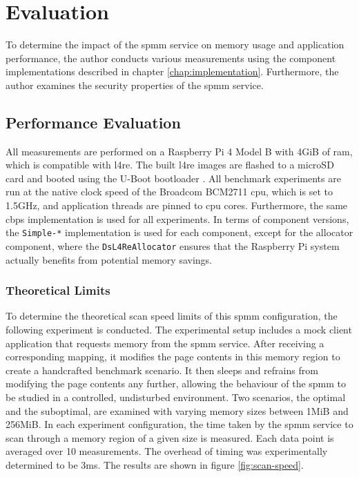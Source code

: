 \chapter{Evaluation}
\label{chap:evaluation}

To determine the impact of the \ac{spmm} service on memory usage and application performance, the author conducts various measurements using the component implementations described in chapter \ref{chap:implementation}.
Furthermore, the author examines the security properties of the \ac{spmm} service.

\section{Performance Evaluation}
\label{sec:performance-evaluation}

All measurements are performed on a Raspberry Pi 4 Model B with 4GiB of \acs{ram}, which is compatible with \ac{l4re}.
The built \ac{l4re} images are flashed to a microSD card and booted using the U-Boot bootloader \cite{u-boot}.
All benchmark experiments are run at the native clock speed of the Broadcom BCM2711 \acs{cpu}, which is set to 1.5GHz, and application threads are pinned to \acs{cpu} cores.
Furthermore, the same \ac{cbps} implementation is used for all experiments.
In terms of component versions, the \texttt{Simple-*} implementation is used for each component, except for the allocator component, where the \texttt{Ds\-L4Re\-Allocator} ensures that the Raspberry Pi system actually benefits from potential memory savings.

\subsection{Theoretical Limits}
\label{subsec:theoretical-limits}

To determine the theoretical scan speed limits of this \ac{spmm} configuration, the following experiment is conducted.
The experimental setup includes a mock client application that requests memory from the \ac{spmm} service.
After receiving a corresponding mapping, it modifies the page contents in this memory region to create a handcrafted benchmark scenario.
It then sleeps and refrains from modifying the page contents any further, allowing the behaviour of the \ac{spmm} to be studied in a controlled, undisturbed environment.
Two scenarios, the optimal and the suboptimal, are examined with varying memory sizes between 1MiB and 256MiB.
In each experiment configuration, the time taken by the \ac{spmm} service to scan through a memory region of a given size is measured.
Each data point is averaged over 10 measurements.
The overhead of timing was experimentally determined to be 3ms.
The results are shown in figure \ref{fig:scan-speed}.

